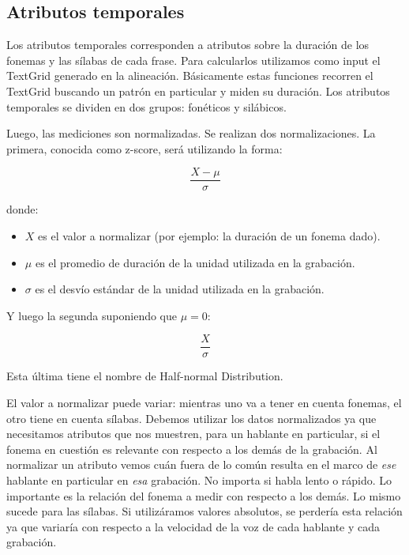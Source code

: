 \subsection{Atributos temporales}

Los atributos temporales corresponden a atributos sobre la duración de los fonemas y las sílabas de cada frase. Para calcularlos utilizamos como input el TextGrid generado en la alineación. Básicamente estas funciones recorren el TextGrid buscando un patrón en particular y miden su duración. Los atributos temporales se dividen en dos grupos: fonéticos y silábicos. 

Luego, las mediciones son normalizadas. Se realizan dos normalizaciones. La primera, conocida como z-score, será utilizando la forma:

\hspace{2cm} \[\frac{ X - \mu }{ \sigma }\]

\noindent donde:

\begin{itemize}
	\item $X$ es el valor a normalizar (por ejemplo: la duración de un fonema dado).
	\item $\mu$ es el promedio de duración de la unidad utilizada en la grabación.
	\item $\sigma$ es el desvío estándar de la unidad utilizada en la grabación.
\end{itemize}

\noindent Y luego la segunda suponiendo que $\mu = 0$:

\hspace{2cm} \[\frac{ X }{ \sigma }\]

\noindent Esta última tiene el nombre de Half-normal Distribution.

El valor a normalizar puede variar: mientras uno va a tener en cuenta fonemas, el otro tiene en cuenta sílabas. Debemos utilizar los datos normalizados ya que necesitamos atributos que nos muestren, para un hablante en particular, si el fonema en cuestión es relevante con respecto a los demás de la grabación. Al normalizar un atributo vemos cuán fuera de lo común resulta en el marco de \textit{ese} hablante en particular en \textit{esa} grabación. No importa si habla lento o rápido. Lo importante es la relación del fonema a medir con respecto a los demás. Lo mismo sucede para las sílabas. Si utilizáramos valores absolutos, se perdería esta relación ya que variaría con respecto a la velocidad de la voz de cada hablante y cada grabación.
 
